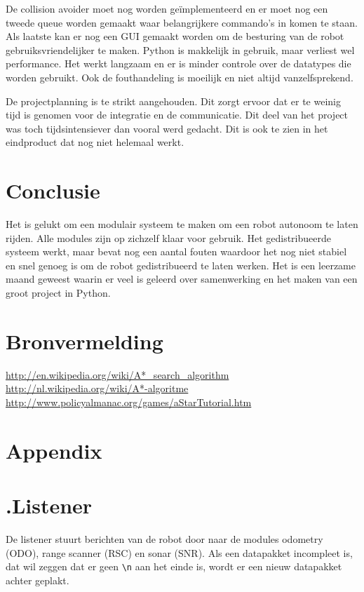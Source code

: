 \documentclass[a4paper,10pt]{article}
\begin{document}
De collision avoider moet nog worden ge\"{i}mplementeerd en er moet nog een tweede queue worden gemaakt waar belangrijkere commando's in komen te staan. Als laatste kan er nog een GUI gemaakt worden om de besturing van de robot gebruiksvriendelijker te maken. Python is makkelijk in gebruik, maar verliest wel performance. Het werkt langzaam en er is minder controle over de datatypes die worden gebruikt. Ook de fouthandeling is moeilijk en niet altijd vanzelfsprekend. 

De projectplanning is te strikt aangehouden. Dit zorgt ervoor dat er te weinig tijd is genomen voor de integratie en de communicatie. Dit deel van het project was toch tijdsintensiever dan vooral werd gedacht. Dit is ook te zien in het eindproduct dat nog niet helemaal werkt.

\section{Conclusie}
Het is gelukt om een modulair systeem te maken om een robot autonoom te laten rijden. Alle modules zijn op zichzelf klaar voor gebruik. Het gedistribueerde systeem werkt, maar bevat nog een aantal fouten waardoor het nog niet stabiel en snel genoeg is om de robot gedistribueerd te laten werken. Het is een leerzame maand geweest waarin er veel is geleerd over samenwerking en het maken van een groot project in Python.

\section{Bronvermelding}
\url{http://en.wikipedia.org/wiki/A*_search_algorithm}\\
\url{http://nl.wikipedia.org/wiki/A*-algoritme}\\
\url{http://www.policyalmanac.org/games/aStarTutorial.htm}\\

\newpage
\section{Appendix}
\appendix
\section*{\label{listener}\thesection.\quad Listener}
De listener stuurt berichten van de robot door naar de modules odometry (ODO), range scanner (RSC) en sonar (SNR). Als een datapakket incompleet is, dat wil zeggen dat er geen \verb!\n! aan het einde is, wordt er een nieuw datapakket achter geplakt.
\end{document}
